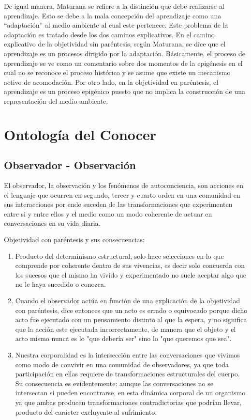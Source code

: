 \documentclass[10pt]{article}
\begin{document}
        De igual manera, Maturana se refiere a la distinción que debe realizarse al aprendizaje. Esto se debe a la mala concepción del aprendizaje como una ``adaptación'' al medio ambiente al cual este pertenece. Este problema de la adaptación es tratado desde los dos caminos explicativos. En el camino explicativo de la objetividad sin paréntesis, según Maturana, se dice que el aprendizaje es un procesos dirigido por la adaptación. Básicamente, el proceso de aprendizaje se ve como un comentario sobre dos momentos de la epigénesis en el cual no se reconoce el proceso histórico y se asume que existe un mecanismo activo de acomodación. Por otro lado, en la objetividad en paréntesis, el aprendizaje es un proceso epigénico puesto que no implica la construcción de una representación del medio ambiente.

    \section{Ontología del Conocer}

        \subsection{Observador - Observación}

        El observador, la observación y los fenómenos de autoconciencia, son acciones en el lenguaje que ocurren en segundo, tercer y cuarto orden en una comunidad en sus interacciones por ende suceden de las transformaciones que experimenten entre si y entre ellos y el medio como un modo coherente de actuar en conversaciones en su vida diaria.

        Objetividad con paréntesis y sus consecuencias:

        \begin{enumerate}
            \item Producto del determinismo estructural, solo hace selecciones en lo que comprende por coherente dentro de sus vivencias, es decir solo concuerda con los sucesos que el mismo ha vivido y experimentado no suele aceptar algo que no le haya sucedido o conozca.
            \item Cuando el observador actúa en función de una explicación de la objetividad con paréntesis, dice entonces que un acto es errado o equivocado porque dicho acto fue ejecutado con un pensamiento distinto al que la espera, y no significa que la acción este ejecutada incorrectamente, de manera que el objeto y el acto mismo nunca es lo "que debería ser" sino lo "que queremos que sea".
            \item Nuestra corporalidad es la intersección entre las conversaciones que vivimos como modo de convivir en una comunidad de observadores, ya que toda participación en ellas requiere de transformaciones estructurales del cuerpo. Su consecuencia es evidentemente: aunque las conversaciones no se intersectan si pueden encontrarse, en esta dinámica corporal de un organismo ya que ambas producen transformaciones contradictorias que podrían llevar, producto del carácter excluyente al sufrimiento.
        \end{enumerate}
\end{document}
